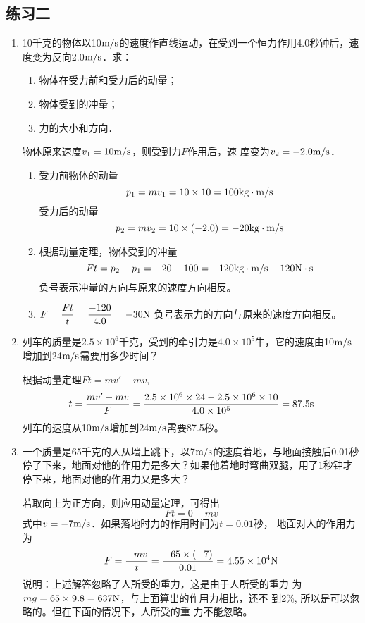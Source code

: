 \subsection{练习二}
\begin{enumerate}
    \item 10千克的物体以10$\text{m}/\text{s}$的速度作直线运动，在受到一个恒力作用4.0秒钟后，速度变为反向2.0$\text{m}/\text{s}$．求：
     \begin{enumerate}
        \item 物体在受力前和受力后的动量；
        \item 物体受到的冲量；
        \item 力的大小和方向．
    \end{enumerate}

    \begin{solution}
物体原来速度$v_1=10\text{m}/\text{s}$，则受到力$F$作用后，速
度变为$v_2=-2.0\text{m}/\text{s}$．
\begin{enumerate}
\item 受力前物体的动量
\[p_1=mv_1=10\times10=100{\rm kg\cdot m/s}\]
受力后的动量
\[p_2=mv_2=10\times(-2.0)=-20{\rm kg\cdot m/s}\]
\item 根据动量定理，物体受到的冲量
\[Ft=p_2-p_1=-20-100=-120{\rm kg\cdot m/s}-120{\rm N\cdot s}\]
负号表示冲量的方向与原来的速度方向相反。
\item $F=\dfrac{Ft}{t}=\dfrac{-120}{4.0}=-30{\rm N}$
负号表示力的方向与原来的速度方向相反。
\end{enumerate}

    
    \end{solution}
    \item 列车的质量是$2.5\times 10^6$千克，受到的牵引力是$4.0\times 
    10^5$牛，它的速度由10$\text{m}/\text{s}$增加到24$\text{m}/\text{s}$需要用多少时间？

    \begin{solution}
        根据动量定理$Ft=mv'-mv$,
\[t=\frac{mv'-mv}{F}=\frac{ 2.5\times10^6\times24-2.5\times10^6\times10}{4.0\times 10^5}= 87.5{\rm s}\]      
列车的速度从10$\text{m}/\text{s}$增加到24$\text{m}/\text{s}$需要87.5秒。
    \end{solution}
    \item 一个质量是65千克的人从墙上跳下，以7$\text{m}/\text{s}$的速度着地，与地面接触后0.01秒停了下来，地面对他的作用力是多大？如果他着地时弯曲双腿，用了1秒钟才停下来，地面对他的作用力又是多大？

    \begin{solution}
若取向上为正方向，则应用动量定理，可得出
\[Ft=0-mv\]
式中$v=-7\text{m}/\text{s}$．如果落地时力的作用时间为$t=0.01$秒，
地面对人的作用力为
\[F=\frac{-mv}{t}=\frac{-65\times (-7)}{0.01}=4.55\times 10^4{\rm N}\]
说明：上述解答忽略了人所受的重力，这是由于人所受的重力
为$mg=65\times9.8=637{\rm N}$，与上面算出的作用力相比，还不
到2\%, 所以是可以忽略的。但在下面的情况下，人所受的重
力不能忽略。


\end{solution}
\end{enumerate}
